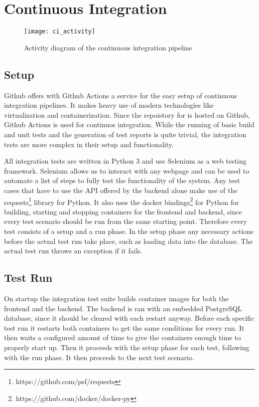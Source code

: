 \section{Continuous Integration}

\begin{figure}[h]
	\centering
  \texttt{[image: ci\_activity]}
  \caption{Activity diagram of the continuous integration pipeline}
\end{figure}

\subsection{Setup}
Github offers with Github Actions a service for the easy setup of continuous integration pipelines. It makes heavy use of modern technologies like virtualization and containerization. Since the repoistory for \parkview{} is hosted on Github, Github Actions is used for continuos integration. While the running of basic build and unit tests and the generation of test reports is quite trivial, the integration tests are more complex in their setup and functionality.

All integration tests are written in Python 3 and use Selenium as a web testing framework. Selenium allows us to interact with any webpage and can be used to automate a list of steps to fully test the functionality of the system. Any test cases that have to use the API offered by the backend alone make use of the requests\footnote{https://github.com/psf/requests} library for Python. It also uses the docker bindings\footnote{https://github.com/docker/docker-py} for Python for building, starting and stopping containers for the frontend and backend, since every test scenario should be run from the same starting point. Therefore every test consists of a setup and a run phase. In the setup phase any necessary actions before the actual test run take place, such as loading data into the database. The actual test run throws an exception if it fails.

\subsection{Test Run}
On startup the integration test suite builds container images for both the frontend and the backend. The backend is ran with an embedded PostgreSQL database, since it should be cleared with each restart anyway. Before each specific test run it restarts both containers to get the same conditions for every run. It then waits a configured amount of time to give the containers enough time to properly start up. Then it proceeds with the setup phase for each test, following with the run phase. It then proceeds to the next test scenario.

